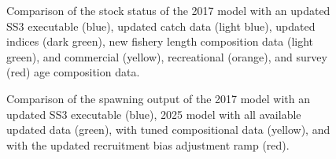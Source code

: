 \documentclass[
]{scrartcl}
\begin{document}
\begin{figure}


\caption{\label{fig-newdata_4}Comparison of the stock status of the 2017
model with an updated SS3 executable (blue), updated catch data (light
blue), updated indices (dark green), new fishery length composition data
(light green), and commercial (yellow), recreational (orange), and
survey (red) age composition data.}

\end{figure}%

\begin{figure}


\caption{\label{fig-newdata_5}Comparison of the spawning output of the
2017 model with an updated SS3 executable (blue), 2025 model with all
available updated data (green), with tuned compositional data (yellow),
and with the updated recruitment bias adjustment ramp (red).}

\end{figure}%
\end{document}
